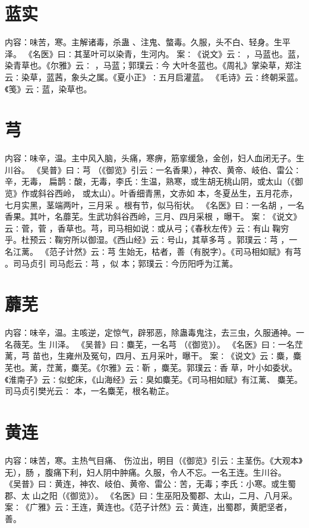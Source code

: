 \documentclass[12pt,UTF8]{ctexbook}
\begin{document}
\section{蓝实}
内容：味苦，寒。主解诸毒，杀蛊 、注鬼、螫毒。久服，头不白、轻身。生平泽。 
《名医》曰∶其茎叶可以染青，生河内。 
案∶《说文》云∶ ，马蓝也。蓝，染青草也。《尔雅》云∶ ，马蓝；郭璞云∶今 
大叶冬蓝也。《周礼》掌染草，郑注云∶染草，蓝茜，象头之属。《夏小正》∶五月启灌蓝。 
《毛诗》云∶终朝采蓝。《笺》云∶蓝，染草也。 


\section{芎}
内容：味辛，温。主中风入脑，头痛，寒痹，筋挛缓急，金创，妇人血闭无子。生川谷。 
《吴普》曰∶芎 （《御览》引云∶一名香果），神农、黄帝、岐伯、雷公∶辛，无毒， 
扁鹊∶酸，无毒，李氏∶生温，熟寒，或生胡无桃山阴，或太山（《御览》作或斜谷西岭， 
或太山）。叶香细青黑，文赤如 本，冬夏丛生，五月花赤，七月实黑，茎端两叶，三月采 
。根有节，似马衔状。 
《名医》曰∶一名胡 ，一名香果。其叶，名蘼芜。生武功斜谷西岭，三月、四月采根 
，曝干。 
案∶《说文》云∶菅，菅 ，香草也。芎，司马相如说∶或从弓；《春秋左传》云∶有山 
鞠穷 
乎。杜预云∶鞠穷所以御湿。《西山经》云∶号山，其草多芎 。郭璞云∶芎 ，一名江蓠。 
《范子计然》云∶芎 生始无，枯者，善（有脱字）。《司马相如赋》有芎 。司马贞引 
司马彪云∶芎 ，似 本；郭璞云∶今历阳呼为江蓠。 


\section{蘼芜}
内容：味辛，温。主咳逆，定惊气，辟邪恶，除蛊毒鬼注，去三虫，久服通神。一名薇芜。生 
川泽。 
《吴普》曰∶麋芜，一名芎 （《御览》）。 
《名医》曰∶一名茳蓠，芎 苗也，生雍州及冤句，四月、五月采叶，曝干。 
案∶《说文》云∶麋，麋芜也。蓠，茳蓠，麋芜。《尔雅》云∶靳 ，麋芜。郭璞云∶香 
草，叶小如委状。《淮南子》云∶似蛇床，《山海经》云∶臭如麋芜。《司马相如赋》有江蓠、 
麋芜。司马贞引樊光云∶ 本，一名麋芜，根名勒芷。 


\section{黄连}
内容：味苦，寒。主热气目痛、 伤泣出，明目（《御览》引云∶主茎伤。《大观本》无），肠 
，腹痛下利，妇人阴中肿痛。久服，令人不忘。一名王连。生川谷。 
《吴普》曰∶黄连，神农、岐伯、黄帝、雷公∶苦，无毒；李氏∶小寒。或生蜀郡、太 
山之阳（《御览》）。 
《名医》曰∶生巫阳及蜀郡、太山，二月、八月采。 
案∶《广雅》云∶王连，黄连也。《范子计然》云∶黄连，出蜀郡，黄肥坚者，善。 
\end{document}
